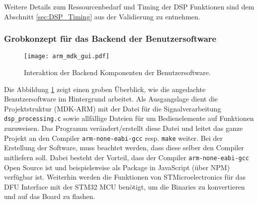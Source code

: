 Weitere Details zum Ressourcenbedarf und Timing der DSP Funktionen sind dem Abschnitt \ref{sec:DSP_Timing} aus der Validierung zu entnehmen.

\subsubsection{Grobkonzept für das Backend der Benutzersoftware}

\begin{figure}[H]
	\centering
	\texttt{[image: arm\_mdk\_gui.pdf]}
	\caption{Interaktion der Backend Komponenten der Benutzersoftware.}
	\label{pic:arm_mdk_gui}
\end{figure}

Die Abbildung \ref{pic:arm_mdk_gui} zeigt einen groben Überblick, wie die angedachte Benutzersoftware im Hintergrund arbeitet. 
Als Ausgangslage dient die Projektstruktur (MDK-ARM) mit der Datei für die Signalverarbeitung \texttt{dsp\_processing.c} sowie allfällige Dateien für um Bedienelemente auf Funktionen zuzuweisen.
Das Programm verändert/erstellt diese Datei und leitet das ganze Projekt an den Compiler \texttt{arm-none-eabi-gcc} resp. \texttt{make} weiter.
Bei der Erstellung der Software, muss beachtet werden, dass diese selber den Compiler mitliefern soll. 
Dabei besteht der Vorteil, dass der Compiler \texttt{arm-none-eabi-gcc} Open Source \cite{ARM-NONE-EABI} ist und beispielsweise als Package in JavaScript (über NPM) \cite{NPM-ARM} verfügbar ist.
Weiterhin werden die Funktionen von STMicroelectronics für das DFU Interface mit der STM32 MCU benötigt, um die Binaries zu konvertieren und auf das Board zu flashen.




